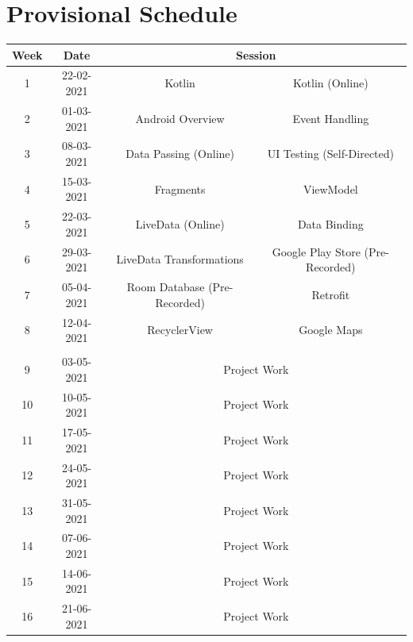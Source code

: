 \documentclass{article}
\begin{document}
\section*{Provisional Schedule}
\renewcommand{\arraystretch}{1.5}
\begin{tabular}{|c|c|c|c|}
	\hline
	\textbf{Week} & \textbf{Date}     & \multicolumn{2}{c|}{\textbf{Session}}          \\ \hline
	\small 1 & \small 22-02-2021 & Kotlin            						& Kotlin (Online)									\\ \hline
	\small 2 & \small 01-03-2021 & Android Overview             & Event Handling \\ \hline
	\small 3 & \small 08-03-2021 & Data Passing (Online)        & UI Testing (Self-Directed)     \\ \hline
	\small 4 & \small 15-03-2021 & Fragments                    & ViewModel      \\ \hline
	\small 5 & \small 22-03-2021 & LiveData (Online)            & Data Binding   \\ \hline
	\small 6 & \small 29-03-2021 & LiveData Transformations     & Google Play Store (Pre-Recorded)        \\ \hline
	\small 7 & \small 05-04-2021 & Room Database (Pre-Recorded) & Retrofit       \\ \hline
	\small 8 & \small 12-04-2021 & RecyclerView                 & Google Maps    \\ \hline
	\rowcolor{yellow} \multicolumn{4}{|c|}{\small Mid Term Break}  \\ \hline
	\small 9 & \small 03-05-2021 & \multicolumn{2}{c|}{\small Project Work}       \\ \hline
	\small 10     & \small 10-05-2021 & \multicolumn{2}{c|}{\small Project Work}        \\ \hline
	\small 11     & \small 17-05-2021 & \multicolumn{2}{c|}{\small Project Work}       \\ \hline
	\small 12     & \small 24-05-2021 & \multicolumn{2}{c|}{\small Project Work}       \\ \hline
	\small 13     & \small 31-05-2021 & \multicolumn{2}{c|}{\small Project Work}       \\ \hline
	\small 14     & \small 07-06-2021 & \multicolumn{2}{c|}{\small Project Work}       \\ \hline
	\small 15     & \small 14-06-2021 & \multicolumn{2}{c|}{\small Project Work}       \\ \hline
	\small 16     & \small 21-06-2021 & \multicolumn{2}{c|}{\small Project Work}       \\ \hline
\end{tabular}
\end{document}
